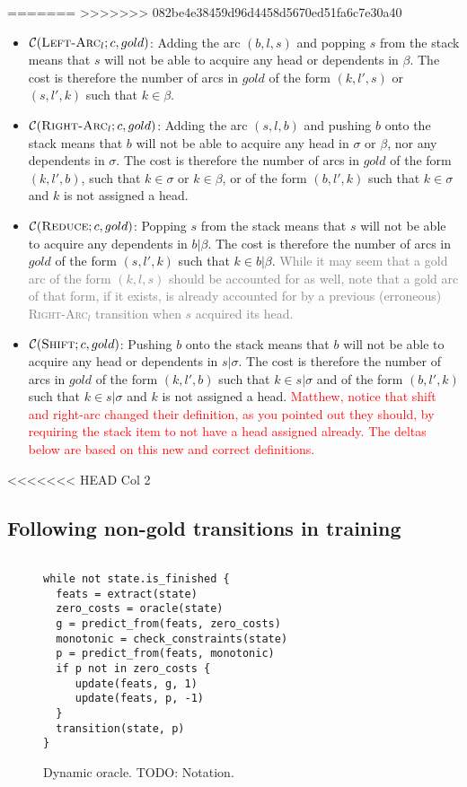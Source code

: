 \documentclass[11pt,letterpaper]{article}
\newcommand{\maybe}[1]{\textcolor{gray}{#1}}
\newcommand{\note}[1]{\textcolor{red}{#1}}
\begin{document}
=======
>>>>>>> 082be4e38459d96d4458d5670ed51fa6c7e30a40
\begin{itemize}
   \item $\mathcal{C}(\textsc{Left-Arc}_l; c, gold)$: 
Adding the arc $(b, l, s)$ and popping $s$ from the stack means that $s$ will not be able
to acquire any head or dependents in $\beta$. The cost is therefore the number of arcs 
in $gold$ of the form $(k, l', s)$ or $(s, l', k)$ such that $k \in \beta$.

\item $\mathcal{C}(\textsc{Right-Arc}_l; c, gold)$: 
Adding the arc $(s, l, b)$ and pushing $b$ onto the stack means that $b$ will 
not be able to acquire any head in $\sigma$ or $\beta$, nor any dependents in $\sigma$. 
The cost is therefore the number of arcs in $gold$ of the form $(k, l', b)$,
such that $k \in \sigma$ or $k \in \beta$, 
or of the form $(b, l', k)$ such that $k \in \sigma$ 
and $k$ is not assigned a head.

\item $\mathcal{C}(\textsc{Reduce}; c, gold)$: 
Popping $s$ from the stack means that $s$ will not be able to acquire any dependents
in $b|\beta$. The cost is therefore the number of arcs in $gold$ of the form $(s, l', k)$
such that $k \in b|\beta$. \maybe{While it may seem that a gold arc of the form $(k, l, s)$ should be accounted for as well,
note that a gold arc of that form, if it exists, is already accounted for by a previous (erroneous) \textsc{Right-Arc}$_l$ 
transition when $s$ acquired its head.}

\item $\mathcal{C}(\textsc{Shift}; c, gold)$: 
Pushing $b$ onto the stack means that $b$ will not be able to acquire any head
or dependents in $s|\sigma$. The cost is therefore the number of arcs in $gold$ of 
the form $(k, l', b)$ such that $k \in s|\sigma$ and of the form $(b, l', k)$ such that $k \in s|\sigma$
and $k$ is not assigned a head.
\note{Matthew, notice that shift and right-arc changed their definition, as
you pointed out they should, by requiring the stack item to not have a head
assigned already. The deltas below are based on this new and correct
definitions.}
\end{itemize}

<<<<<<< HEAD
 Col 2
\subsection{Following non-gold transitions in training}
\begin{figure}
\centering
    \begin{verbatim}

while not state.is_finished {
  feats = extract(state)
  zero_costs = oracle(state)
  g = predict_from(feats, zero_costs)
  monotonic = check_constraints(state)
  p = predict_from(feats, monotonic)
  if p not in zero_costs {
     update(feats, g, 1)
     update(feats, p, -1)
  }
  transition(state, p)
}
\end{verbatim}
\caption{Dynamic oracle. TODO: Notation.}
\end{figure}
\end{document}
